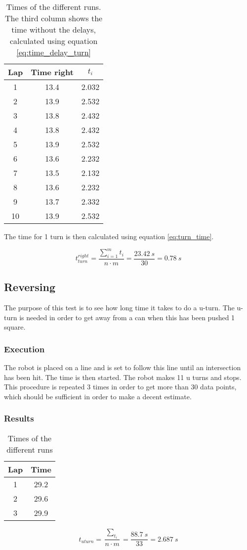 \documentclass[a4paper,10pt]{article}
\begin{document}
\begin{table} [H]
\centering
 \begin{tabular}{|c|c|c|}
  \hline Lap & Time right & $t_i$ \\ \hline
  1  & 13.4  & 2.032 \\  \hline
  2  & 13.9  & 2.532 \\  \hline
  3  & 13.8  & 2.432 \\  \hline
  4  & 13.8  & 2.432 \\  \hline
  5  & 13.9  & 2.532 \\  \hline
  6  & 13.6  & 2.232 \\  \hline
  7  & 13.5  & 2.132 \\  \hline
  8  & 13.6  & 2.232 \\  \hline
  9  & 13.7  & 2.332 \\  \hline
  10 & 13.9  & 2.532 \\ \hline
 \end{tabular}
 \caption{Times of the different runs. The third column shows the time without the delays, calculated using equation \ref{eq:time_delay_turn}}
 \label{tab:time_right}
\end{table}

The time for 1 turn is then calculated using equation \ref{eq:turn_time}.

$$
t_{turn}^{right} = \frac{\sum^{m}_{i=1}t_i}{n\cdot m} = \frac{23.42\ s}{30} = 0.78\ s
$$

\subsection{Reversing}
The purpose of this test is to see how long time it takes to do a u-turn. The u-turn is needed in order to get away from a can when this has been pushed 1 square.

\subsubsection{Execution}
The robot is placed on a line and is set to follow this line until an intersection has been hit. The time is then started. The robot makes 11 u turns and stops. This procedure is repeated 3 times in order to get more than 30 data points, which should be sufficient in order to make a decent estimate.

\subsubsection{Results}

\begin{table} [H]
\centering
 \begin{tabular}{|c|c|}
  \hline Lap & Time \\ \hline
  1  & 29.2  \\  \hline
  2  & 29.6  \\  \hline
  3  & 29.9  \\  \hline
 \end{tabular}
 \caption{Times of the different runs}
 \label{tab:time_uturn}
\end{table}

$$
t_{uturn} = \frac{\sum_{t_i}}{n\cdot m} = \frac{88.7\ s}{33} = 2.687\ s
$$
\end{document}
